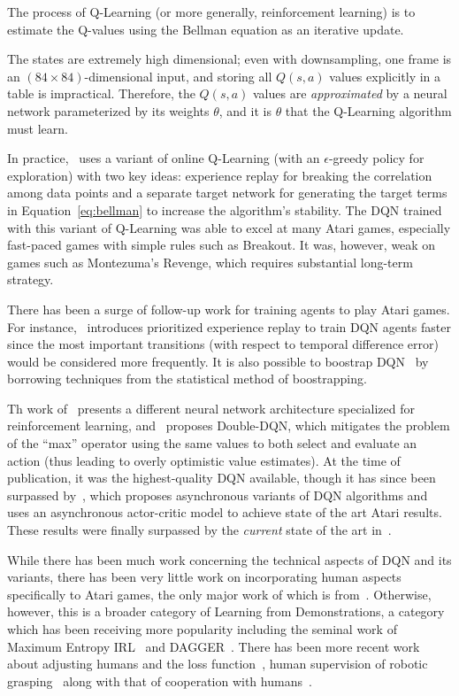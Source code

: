 \documentclass[letterpaper, 10pt, conference]{ieeeconf}
\begin{document}
The process of Q-Learning (or more generally, reinforcement learning) is to
estimate the Q-values using the Bellman equation as an iterative update.

The states are extremely high dimensional; even with downsampling, one frame is
an $(84\times 84)$-dimensional input, and storing all $Q(s,a)$ values explicitly
in a table is impractical.  Therefore, the $Q(s,a)$ values are
\emph{approximated} by a neural network parameterized by its weights $\theta$,
and it is $\theta$ that the Q-Learning algorithm must learn.

In practice,~\cite{mnih-dqn-2015} uses a variant of online Q-Learning (with an
$\epsilon$-greedy policy for exploration) with two key ideas: experience replay
for breaking the correlation among data points and a separate target network
for generating the target terms in Equation~\ref{eq:bellman} to increase the
algorithm's stability. The DQN trained with this variant of Q-Learning was able
to excel at many Atari games, especially fast-paced games with simple rules such
as Breakout. It was, however, weak on games such as Montezuma's Revenge, which
requires substantial long-term strategy.

There has been a surge of follow-up work for training agents to play Atari
games. For instance,~\cite{Schaul2016} introduces prioritized experience replay
to train DQN agents faster since the most important transitions (with respect to
temporal difference error) would be considered more frequently. It is also
possible to boostrap DQN~\cite{NIPS2016_6501} by borrowing techniques from the
statistical method of boostrapping.

Th work of~\cite{DBLP:conf/icml/WangSHHLF16} presents a different neural network
architecture specialized for reinforcement learning,
and~\cite{DBLP:conf/aaai/HasseltGS16} proposes Double-DQN, which mitigates
the problem of the ``max'' operator using the same values to both select and
evaluate an action (thus leading to overly optimistic value estimates). At the
time of publication, it was the highest-quality DQN available, though it has
since been surpassed by~\cite{DBLP:conf/icml/MnihBMGLHSK16}, which proposes
asynchronous variants of DQN algorithms and uses an asynchronous actor-critic
model to achieve state of the art Atari results. These results were finally
surpassed by the \emph{current} state of the art
in~\cite{DBLP:journals/corr/JaderbergMCSLSK16}.

While there has been much work concerning the technical aspects of DQN and its
variants, there has been very little work on incorporating human aspects
specifically to Atari games, the only major work of which is
from~\cite{DBLP:journals/corr/HosuR16}. Otherwise, however, this is a broader
category of Learning from Demonstrations, a category which has been receiving
more popularity including the seminal work of Maximum Entropy
IRL~\cite{Ziebart_2008_6055} and DAGGER~\cite{DBLP:journals/jmlr/RossGB11}.
There has been more recent work about adjusting humans and the loss
function~\cite{conf/nips/KimFPP13}, human supervision of robotic
grasping~\cite{DBLP:journals/corr/LaskeyCLMKJDG16,DBLP:dblp_conf/icra/LaskeySHMPDG16}
along with that of cooperation with humans~\cite{NIPS2016_6420}.
\end{document}

